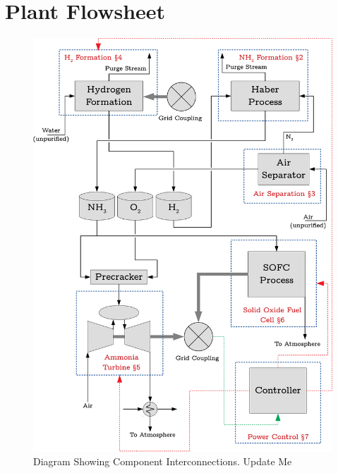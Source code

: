 \section{Plant Flowsheet}

\begin{figure}[H]
        \centering
        \includegraphics[scale=0.7]{plantdiagram.pdf}
        \caption{Diagram Showing Component Interconnections. {\color{red} Update Me}}
        \label{fig:plantglobaldiagram}
\end{figure}